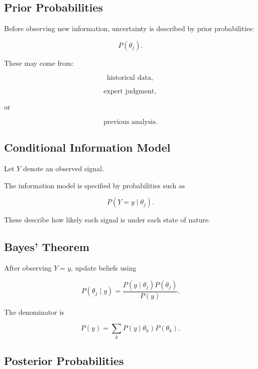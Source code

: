 \subsection{Prior Probabilities}
\label{subsec:prior-probabilities}

Before observing new information, uncertainty is described by prior
probabilities:

\[
\boxed{
P(\theta_j).
}
\]

These may come from:

\[
\boxed{
\text{historical data},
}
\]

\[
\boxed{
\text{expert judgment},
}
\]

or

\[
\boxed{
\text{previous analysis}.
}
\]

\subsection{Conditional Information Model}
\label{subsec:conditional-information-model}

Let \(Y\) denote an observed signal.

The information model is specified by probabilities such as

\[
\boxed{
P(Y=y\mid\theta_j).
}
\]

These describe how likely each signal is under each state of nature.

\subsection{Bayes' Theorem}
\label{subsec:bayes-theorem-decision}

After observing \(Y=y\), update beliefs using

\[
\boxed{
P(\theta_j\mid y)
=
\frac{
P(y\mid\theta_j)
P(\theta_j)
}{
P(y)
}.
}
\]

The denominator is

\[
\boxed{
P(y)
=
\sum_k
P(y\mid\theta_k)
P(\theta_k).
}
\]

\subsection{Posterior Probabilities}
\label{subsec:posterior-probabilities}

